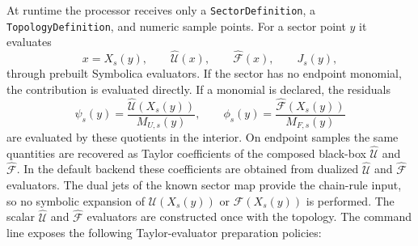 \documentclass[11pt]{article}
\newcommand{\U}{\mathcal U}
\newcommand{\F}{\mathcal F}
\newcommand{\hU}{\widehat{\mathcal U}}
\newcommand{\hF}{\widehat{\mathcal F}}
\begin{document}
At runtime the processor receives only a \texttt{SectorDefinition}, a
\texttt{TopologyDefinition}, and numeric sample points.  For a sector point
\(y\) it evaluates
\begin{equation}
  x = X_s(y),
  \qquad
  \hU(x),
  \qquad
  \hF(x),
  \qquad
  J_s(y),
\end{equation}
through prebuilt Symbolica evaluators.  If the sector has no endpoint
monomial, the contribution is evaluated directly.  If a monomial is declared,
the residuals
\begin{equation}
  \psi_s(y)=\frac{\hU(X_s(y))}{M_{U,s}(y)},
  \qquad
  \phi_s(y)=\frac{\hF(X_s(y))}{M_{F,s}(y)}
\end{equation}
are evaluated by these quotients in the interior.  On endpoint samples the
same quantities are recovered as Taylor coefficients of the composed black-box
\(\hU\) and \(\hF\).  In the default backend these coefficients are obtained
from dualized \(\hU\) and \(\hF\) evaluators.  The dual jets of the known sector
map provide the chain-rule input, so no symbolic expansion of \(\U(X_s(y))\) or
\(\F(X_s(y))\) is performed.  The scalar \(\hU\) and \(\hF\) evaluators are
constructed once with the topology.  The command line exposes the following
Taylor-evaluator preparation policies:
\end{document}
